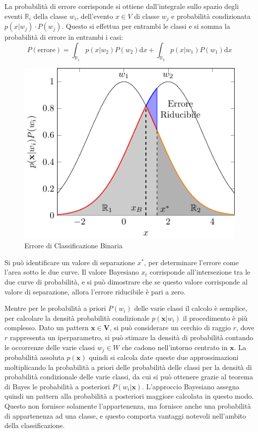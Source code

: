 \documentclass{article}
\numberwithin{equation}{subsection}
\newcommand{\vect}[1]{\boldsymbol{\mathbf{#1}}}
\begin{document}
La probabilità di errore corrisponde si ottiene dall'integrale sullo spazio degli eventi $\mathbb{R}_i$ della classe $w_i$, dell'evento $x\in V$ di classe $w_j$ e probabilità condizionata $p(x|w_j)\cdot P(w_j)$. Questo si effettua per entrambi le classi e si somma la probabilità di errore in entrambi i casi:
\begin{equation*}
    P(\text{errore})=\displaystyle\int_{\mathbb{R}_1}p(x|w_2)P(w_2)\text{d}x+\int_{\mathbb{R}_2}p(x|w_1)P(w_1)\text{d}x
\end{equation*}

\begin{figure}[H]%
    \centering%
    \includegraphics[scale=0.8]{errore.pdf}%
    \caption{Errore di Classificazione Binaria}
\end{figure}

Si può identificare un valore di separazione $x^*$, per determinare l'errore come l'area sotto le due curve. Il valore Bayesiano $x_t$ corrisponde all'intersezione tra le due curve di probabilità, e si può dimostrare che se questo valore corrisponde al valore di separazione, allora l'errore riducibile è pari a zero. 

Mentre per le probabilità a priori $P(w_i)$ delle varie classi il calcolo è semplice, 
per calcolare la densità probabilità condizionale $p(\vect{x}|w_i)$ il procedimento è più complesso. Dato un pattern $\vect{x}\in\vect{V}$, si può considerare un cerchio di raggio $r$, dove $r$ rappresenta un iperparametro, si può stimare la densità di probabilità contando le occorrenze delle varie classi $w_j\in W$ che cadono nell'intorno centrato in $\vect{x}$. 
La probabilità assoluta $p(\vect{x})$ quindi si calcola date queste due approssimazioni moltiplicando la probabilità a priori delle probabilità delle classi per la densità di probabilità condizionale delle varie classi, da cui si può 
ottenere grazie al teorema di Bayes le probabilità a posteriori $P(w_i|\vect{x})$. 
L'approccio Bayesiano assegna quindi un pattern alla probabilità a posteriori maggiore calcolata in questo modo. 
Questo non fornisce solamente l'appartenenza, ma fornisce anche una probabilità di appartenenza ad una classe, e questo comporta vantaggi notevoli nell'ambito della classificazione. 
\end{document}
